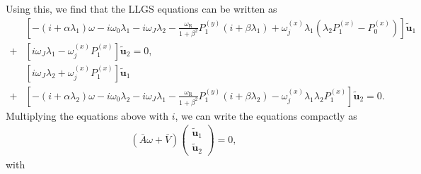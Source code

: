 Using this, we find that the LLGS equations can be written as
\begin{subequations}
\begin{align}
    \nonumber&\left[-(i+\alpha\lambda_1)\omega - i\omega_0\lambda_1 - i\omega_J\lambda_2 -\frac{\omega_{\text{R}}}{1+\beta^2}P^{(y)}_1(i+\beta\lambda_1) + \omega^{(x)}_j\lambda_1(\lambda_2P^{(x)}_1 - P^{(x)}_0)\right]\tilde{\mathbold{u}}_1 \\
    + &\left[ i\omega_J\lambda_1 - \omega^{(x)}_jP^{(x)}_1 \right]\tilde{\mathbold{u}}_2 = 0, \\
    \nonumber&\left[i\omega_J\lambda_2 + \omega^{(x)}_jP^{(x)}_1\right]\tilde{\mathbold{u}}_1 \\
    + &\left[-(i+\alpha\lambda_2)\omega - i\omega_0\lambda_2 - i\omega_J\lambda_1 -\frac{\omega_{\text{R}}}{1+\beta^2}P^{(y)}_1(i+\beta\lambda_2) - \omega^{(x)}_j\lambda_1\lambda_2P^{(x)}_1 \right]\tilde{\mathbold{u}}_2 = 0.
\end{align}
\end{subequations}
Multiplying the equations above with $i$, we can write the equations compactly as
\begin{align}
    \label{eq:EigenvalueEqn_app}
    \left(\bar{A}\omega + \bar{V}\right)
    \begin{pmatrix}
     \tilde{\mathbold{u}}_1 \\
     \tilde{\mathbold{u}}_2
    \end{pmatrix}
    = 0,
\end{align}
with

